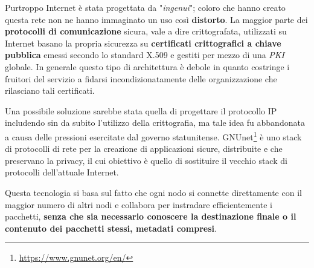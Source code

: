 \bigbreak
Purtroppo Internet è stata progettata da "\emph{ingenui}"; coloro che hanno creato questa rete non ne hanno immaginato un uso così \textbf{distorto}.
La maggior parte dei \textbf{protocolli di comunicazione} sicura, vale a dire crittografata, utilizzati su Internet basano la propria sicurezza su \textbf{certificati crittografici a chiave pubblica} emessi secondo lo standard X.509 e gestiti per mezzo di una \emph{PKI} globale.
In generale questo tipo di architettura è debole in quanto costringe i fruitori del servizio a fidarsi incondizionatamente delle organizzazione che rilasciano tali certificati.

Una possibile soluzione sarebbe stata quella di progettare il protocollo IP includendo sin da subito l'utilizzo della crittografia, ma tale idea fu abbandonata a causa delle pressioni esercitate dal governo statunitense.
\bigbreak
GNUnet\footnote{\url{https://www.gnunet.org/en/}} è uno stack di protocolli di rete per la creazione di applicazioni sicure, distribuite e che preservano la privacy, il cui obiettivo è quello di sostituire il vecchio stack di protocolli dell'attuale Internet.

Questa tecnologia si basa sul fatto che  ogni nodo si connette direttamente con il maggior numero di altri nodi e collabora per instradare efficientemente i pacchetti, \textbf{senza che sia necessario conoscere la destinazione finale o il contenuto dei pacchetti stessi, metadati compresi}.